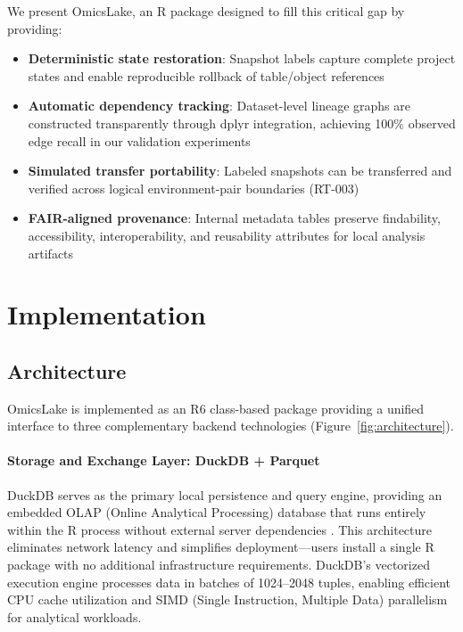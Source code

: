 \documentclass[11pt,a4paper]{article}
\begin{document}
We present OmicsLake, an R package designed to fill this critical gap by providing:
\begin{itemize}
    \item \textbf{Deterministic state restoration}: Snapshot labels capture complete project states and enable reproducible rollback of table/object references
    \item \textbf{Automatic dependency tracking}: Dataset-level lineage graphs are constructed transparently through dplyr integration, achieving 100\% observed edge recall in our validation experiments
    \item \textbf{Simulated transfer portability}: Labeled snapshots can be transferred and verified across logical environment-pair boundaries (RT-003)
    \item \textbf{FAIR-aligned provenance}: Internal metadata tables preserve findability, accessibility, interoperability, and reusability attributes for local analysis artifacts
\end{itemize}

\section{Implementation}

\subsection{Architecture}

OmicsLake is implemented as an R6 class-based package providing a unified interface to three complementary backend technologies (Figure~\ref{fig:architecture}).

\paragraph{Storage and Exchange Layer: DuckDB + Parquet}
DuckDB serves as the primary local persistence and query engine, providing an embedded OLAP (Online Analytical Processing) database that runs entirely within the R process without external server dependencies \citep{raasveldt2019duckdb}. This architecture eliminates network latency and simplifies deployment---users install a single R package with no additional infrastructure requirements. DuckDB's vectorized execution engine processes data in batches of 1024--2048 tuples, enabling efficient CPU cache utilization and SIMD (Single Instruction, Multiple Data) parallelism for analytical workloads.
\end{document}
